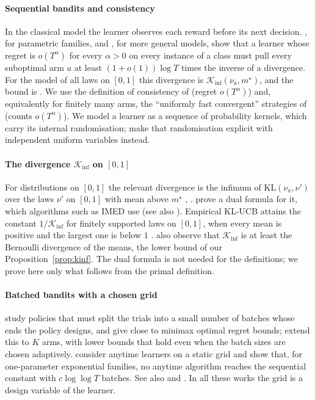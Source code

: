\documentclass[11pt]{article}
\newcommand{\1}{\mathbf{1}}
\begin{document}
\paragraph{Sequential bandits and consistency} In the classical model the learner observes each
reward before its next decision. \citet{LR85}, for parametric families, and \citet{BK96}, for
more general models, show that a learner whose regret is $o(T^\alpha)$ for every $\alpha>0$ on
every instance of a class must pull every suboptimal arm $a$ at least $(1+o(1))\log T$ times the
inverse of a divergence. For the model of all laws on $[0,1]$ this divergence is
$\mathcal K_{\inf}(\nu_a,m^\star)$, and the bound is \citet[Theorem~1]{GMS19}. We use the definition
of consistency of \citet[Definition~16.1]{LS} (regret $o(T^\alpha)$) and, equivalently for finitely
many arms, the ``uniformly fast convergent'' strategies of \citet[Definition~1]{GMS19} (counts
$o(T^\alpha)$). We model a learner as a sequence of probability kernels, which carry its internal
randomisation; \citet[Section~1.1]{GMS19} make that randomisation explicit with independent
uniform variables instead.

\paragraph{The divergence $\mathcal K_{\inf}$ on $[0,1]$} For distributions on $[0,1]$ the
relevant divergence is the infimum of $\mathrm{KL}(\nu_a,\nu')$ over the laws $\nu'$ on $[0,1]$ with
mean above $m^\star$ \citep{BK96}, \citep[Section~1.2]{GMS19}. \citet[Theorem~8]{HT10} prove a dual
formula for it, which algorithms such as IMED use (see also \citet{HT15}). Empirical KL-UCB attains
the constant $1/\mathcal K_{\inf}$ for finitely supported laws on $[0,1]$, when every mean is
positive and the largest one is below $1$ \citep[Theorem~2]{CGMMS13}. \citet[Section~6.1]{CGMMS13}
also observe that $\mathcal K_{\inf}$ is at least the Bernoulli divergence of the means, the lower
bound of our Proposition~\ref{prop:kinf}. The dual formula is not needed for the definitions; we
prove here only what follows from the primal definition.

\paragraph{Batched bandits with a chosen grid} \citet{PRCS16} study policies that must split the
trials into a small number of batches whose ends the policy designs, and give close to minimax
optimal regret bounds; \citet{GHRZ19} extend this to $K$ arms, with lower bounds that hold even when
the batch sizes are chosen adaptively. \citet[Theorem~4]{JTXHXG21} consider anytime learners on a
static grid and show that, for one-parameter exponential families, no anytime algorithm reaches the
sequential constant with $c\log\log T$ batches. See also \citet{EKMM21} and \citet{JXXG21}. In all
these works the grid is a design variable of the learner.
\end{document}

